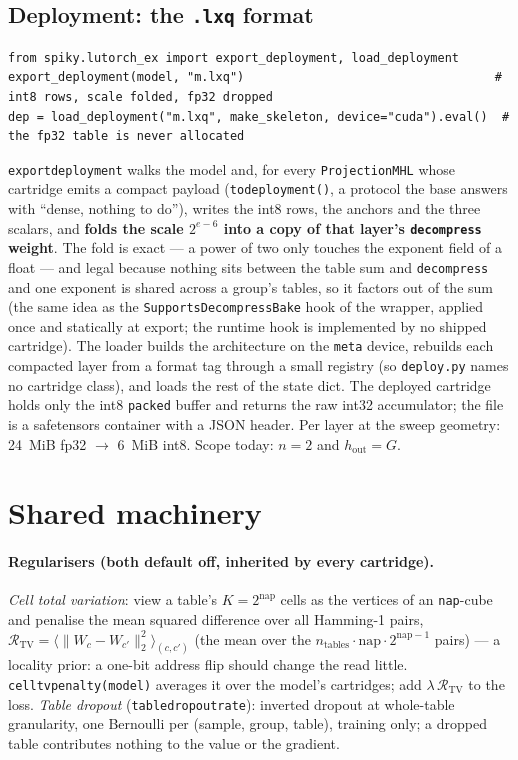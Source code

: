 \documentclass[11pt]{article}
\DeclareRobustCommand{\code}[1]{{\renewcommand{\_}{\textunderscore\allowbreak}\texttt{#1}}}
\begin{document}
\subsection{Deployment: the \code{.lxq} format}
\label{sec:deploy}
\begin{lstlisting}
from spiky.lutorch_ex import export_deployment, load_deployment
export_deployment(model, "m.lxq")                                   # int8 rows, scale folded, fp32 dropped
dep = load_deployment("m.lxq", make_skeleton, device="cuda").eval()  # the fp32 table is never allocated
\end{lstlisting}
\code{export\_deployment} walks the model and, for every \code{ProjectionMHL} whose cartridge emits a
compact payload (\code{to\_deployment()}, a protocol the base answers with ``dense, nothing to do''),
writes the int8 rows, the anchors and the three scalars, and \textbf{folds the scale $2^{e-6}$ into a copy
of that layer's \code{decompress} weight}. The fold is exact --- a power of two only touches the exponent
field of a float --- and legal because nothing sits between the table sum and \code{decompress} and one
exponent is shared across a group's tables, so it factors out of the sum (the same idea as the
\code{SupportsDecompressBake} hook of the wrapper, applied once and statically at export; the runtime
hook is implemented by no shipped cartridge). The loader builds the architecture on the \code{meta}
device, rebuilds each compacted layer from a format tag through a small registry (so \code{deploy.py}
names no cartridge class), and loads the rest of the state dict. The deployed cartridge holds only the
int8 \code{packed} buffer and returns the raw int32 accumulator; the file is a safetensors container with
a JSON header. Per layer at the sweep geometry: 24~MiB fp32 $\to$ 6~MiB int8. Scope today: $n{=}2$ and
$h_\text{out}=G$.

\section{Shared machinery}
\label{sec:machinery}

\paragraph{Regularisers (both default off, inherited by every cartridge).} \emph{Cell total variation}:
view a table's $K=2^{\text{nap}}$ cells as the vertices of an \code{nap}-cube and penalise the mean squared
difference over all Hamming-1 pairs, $\mathcal R_\text{TV}=\langle\|W_c-W_{c'}\|_2^2\rangle_{(c,c')}$
(the mean over the $n_\text{tables}\cdot\text{nap}\cdot2^{\text{nap}-1}$ pairs) --- a locality prior: a
one-bit address flip should change the read little. \code{cell\_tv\_penalty(model)}
averages it over the model's cartridges; add $\lambda\,\mathcal R_\text{TV}$ to the loss. \emph{Table
dropout} (\code{table\_dropout\_rate}): inverted dropout at whole-table granularity, one Bernoulli per
(sample, group, table), training only; a dropped table contributes nothing to the value or the gradient.
\end{document}
